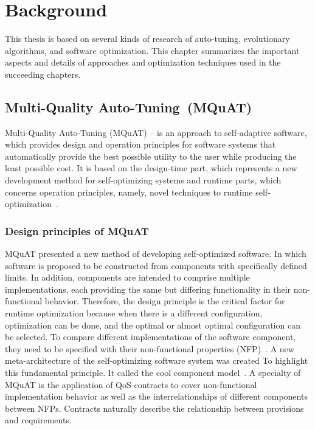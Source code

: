 \chapter{Background}
This thesis is based on several kinds of research of auto-tuning, evolutionary algorithms, and software optimization. This chapter summarizes the important aspects and details of approaches and optimization techniques used in the succeeding chapters.  

\section{Multi-Quality Auto-Tuning~(MQuAT)}
Multi-Quality Auto-Tuning (MQuAT) – is an approach to self-adaptive software, which provides design and operation principles for software systems that automatically provide the best possible utility to the user while producing the least possible cost.
It is based on the design-time part, which represents a new development method for self-optimizing systems and runtime parts, which concerns operation principles, namely,  novel techniques to runtime self-optimization~\cite{gotz13}.

\subsection{Design principles of MQuAT}
MQuAT presented a new method of developing self-optimized software. In which software is proposed to be constructed from components with specifically defined limits. In addition, components are intended to comprise multiple implementations, each providing the same but differing functionality in their non-functional behavior. Therefore, the design principle is the critical factor for runtime optimization because when there is a different configuration, optimization can be done, and the optimal or almost optimal configuration can be selected. To compare different implementations of the software component, they need to be specified with their non-functional properties (NFP)~\cite{gotz13}.
A new meta-architecture of the self-optimizing software system was created To highlight this fundamental principle. It called the cool component model~\cite{gotz10}.
A specialty of MQuAT is the application of QoS contracts to cover non-functional implementation behavior as well as the interrelationships of different components between NFPs. Contracts naturally describe the relationship between provisions and requirements.

